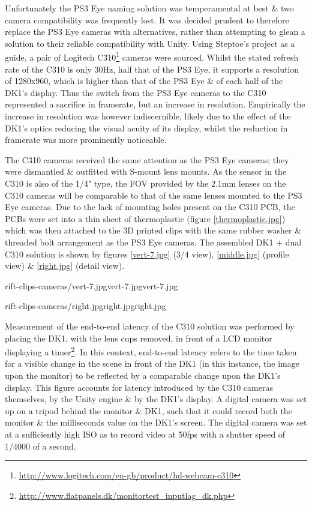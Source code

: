 Unfortunately the PS3 Eye naming solution was temperamental at best \& two camera compatibility was frequently lost. It was decided prudent to therefore replace the PS3 Eye cameras with alternatives, rather than attempting to glean a solution to their reliable compatibility with Unity. Using Steptoe's project as a guide, a pair of Logitech C310\footnote{\url{http://www.logitech.com/en-gb/product/hd-webcam-c310}} cameras were sourced. Whilst the stated refresh rate of the C310 is only 30Hz, half that of the PS3 Eye, it supports a resolution of 1280x960, which is higher than that of the PS3 Eye \& of each half of the DK1's display. Thus the switch from the PS3 Eye cameras to the C310 represented a sacrifice in framerate, but an increase in resolution. Empirically the increase in resolution was however indiscernible, likely due to the effect of the DK1's optics reducing the visual acuity of its display, whilst the reduction in framerate was more prominently noticeable.

The C310 cameras received the same attention as the PS3 Eye cameras; they were dismantled \& outfitted with S-mount lens mounts. As the sensor in the C310 is also of the 1/4" type, the FOV provided by the 2.1mm lenses on the C310 cameras will be comparable to that of the same lenses mounted to the PS3 Eye cameras. Due to the lack of mounting holes present on the C310 PCB, the PCBs were set into a thin sheet of thermoplastic (figure \ref{thermoplastic.jpg}) which was then attached to the 3D printed clips with the same rubber washer \& threaded bolt arrangement as the PS3 Eye cameras. The assembled DK1 + dual C310 solution is shown by figures \ref{vert-7.jpg} (3/4 view), \ref{middle.jpg} (profile view) \& \ref{right.jpg} (detail view).

       {rift-clips-cameras/vert-7.jpg}{vert-7.jpg}{vert-7.jpg}

       {rift-clips-cameras/right.jpg}{right.jpg}{right.jpg}

Measurement of the end-to-end latency of the C310 solution was performed by placing the DK1, with the lens cups removed, in front of a LCD monitor displaying a timer\footnote{\url{http://www.flatpanels.dk/monitortest_inputlag_dk.php}}. In this context, end-to-end latency refers to the time taken for a visible change in the scene in front of the DK1 (in this instance, the image upon the monitor) to be reflected by a comparable change upon the DK1's display. This figure accounts for latency introduced by the C310 cameras themselves, by the Unity engine \& by the DK1's display. A digital camera was set up on a tripod behind the monitor \& DK1, such that it could record both the monitor \& the milliseconds value on the DK1's screen. The digital camera was set at a sufficiently high ISO as to record video at 50fps with a shutter speed of 1/4000 of a second.

